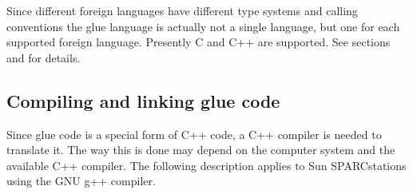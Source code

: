 \documentclass[letterpaper,10pt,english]{sphinxmanual}
\begin{document}
Since different foreign languages have different type systems and calling conventions the glue language
is actually not a single language, but one for each supported foreign language. Presently C
and C++ are supported. See sections {\hyperref[\detokenize{vmref:c-glue}]{}} and {\hyperref[\detokenize{vmref:id2}]{}} for details.


\subsection{Compiling and linking glue code}
\label{\detokenize{vmref:index-65}}\label{\detokenize{vmref:compiling-and-linking-glue-code}}
Since glue code is a special form of C++ code, a C++ compiler is needed to translate it. The way
this is done may depend on the computer system and the available C++ compiler. The following
description applies to Sun SPARCstations using the GNU g++ compiler.
\end{document}
